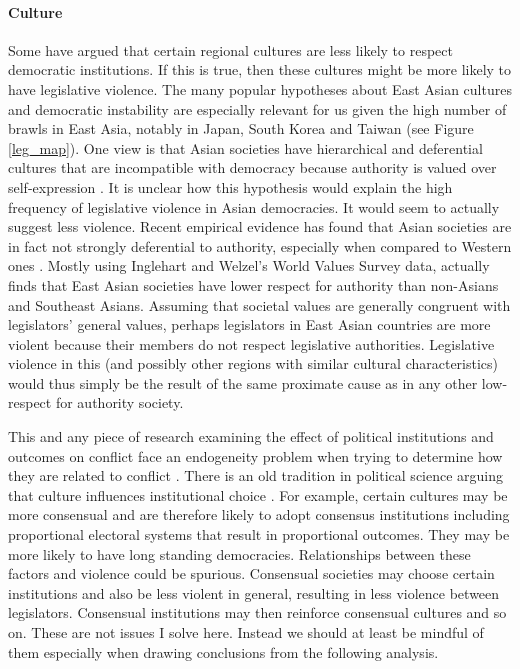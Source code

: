 \documentclass[a4paper]{article}\usepackage{graphicx, color}
\begin{document}
\paragraph{Culture}

Some have argued that certain regional cultures are less likely to respect democratic institutions. If this is true, then these cultures might be more likely to have legislative violence. The many popular hypotheses about East Asian cultures and democratic instability are especially relevant for us given the high number of brawls in East Asia, notably in Japan, South Korea and Taiwan (see Figure \ref{leg_map}). One view is that Asian societies have hierarchical and deferential cultures that are incompatible with democracy because authority is valued over self-expression \citep[see][212-213 for a discussion]{Dalton2005}. It is unclear how this hypothesis would explain the high frequency of legislative violence in Asian democracies. It would seem to actually suggest less violence. Recent empirical evidence has found that Asian societies are in fact not strongly deferential to authority, especially when compared to Western ones \citep{Dalton2005, KimAsianValues2010}. Mostly using Inglehart and Welzel's World Values Survey data, \cite{KimAsianValues2010} actually finds that East Asian societies have lower respect for authority than non-Asians and Southeast Asians. Assuming that societal values are generally congruent with legislators' general values, perhaps legislators in East Asian countries are more violent because their members do not respect legislative authorities. Legislative violence in this (and possibly other regions with similar cultural characteristics) would thus simply be the result of the same proximate cause as in any other low-respect for authority society.

This and any piece of research examining the effect of political institutions and outcomes on conflict face an endogeneity problem when trying to determine how they are related to conflict \citep[][751]{Carey2000}. There is an old tradition in political science \citep[][528--529]{Frye1997} arguing that culture influences institutional choice \citep[in particular see][]{Almond1963}. For example, certain cultures may be more consensual and are therefore likely to adopt consensus institutions \citep[][22-23]{Lijphart2003} including proportional electoral systems that result in proportional outcomes. They may be more likely to have long standing democracies. Relationships between these factors and violence could be spurious. Consensual societies may choose certain institutions and also be less violent in general, resulting in less violence between legislators. Consensual institutions may then reinforce consensual cultures and so on. These are not issues I solve here. Instead we should at least be mindful of them especially when drawing conclusions from the following analysis.
\end{document}
